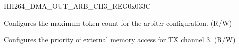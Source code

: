 \begin{register}{H}{H264\_DMA\_OUT\_ARB\_CH3\_REG}{0x033C}\label{regdesc:H264DMAOUTARBCH3REG}
%
%
%
\regnewline%
\begin{regdesc}\begin{reglist}
\label{fielddesc:H264DMAOUTARBTOKENNUMCH3}\item [H264\_DMA\_OUT\_ARB\_TOKEN\_NUM\_CH3] Configures the maximum token count for the arbiter configuration. (R/W)
\label{fielddesc:H264DMAEXTEROUTARBPRIORITYCH3}\item [H264\_DMA\_EXTER\_OUT\_ARB\_PRIORITY\_CH3] Configures the priority of external memory access for TX channel 3. (R/W)
\end{reglist}\end{regdesc}
\end{register}




